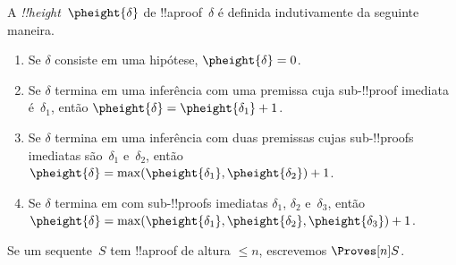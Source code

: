 \documentclass[../../../include/open-logic-section]{subfiles}
\begin{document}


\begin{defn}
A \emph{!!{height}}~$\pheight{\delta}$ de !!a{proof}~$\delta$ é
definida indutivamente da seguinte maneira.
\begin{enumerate}
  \item Se $\delta$ consiste em uma hipótese, $\pheight{\delta} = 0$.
  \item Se $\delta$ termina em uma inferência com uma premissa cuja
  sub-!!{proof} imediata é~$\delta_1$, então $\pheight{\delta} = \pheight{\delta_1} + 1$.
  \item Se $\delta$ termina em uma inferência com duas premissas cujas
  sub-!!{proof}s imediatas são~$\delta_1$ e~$\delta_2$, então $\pheight{\delta} =
  \max(\pheight{\delta_1}, \pheight{\delta_2}) + 1$.
  \item Se $\delta$ termina em \Elim{\lor} com sub-!!{proof}s imediatas
  $\delta_1$, $\delta_2$ e~$\delta_3$, então $\pheight{\delta} =
  \max(\pheight{\delta_1}, \pheight{\delta_2}, \pheight{\delta_3}) + 1$.
\end{enumerate}
Se um sequente~$S$ tem !!a{proof} de altura $\le n$, escrevemos $\Proves[n] S$.
\end{defn}
\end{document}
